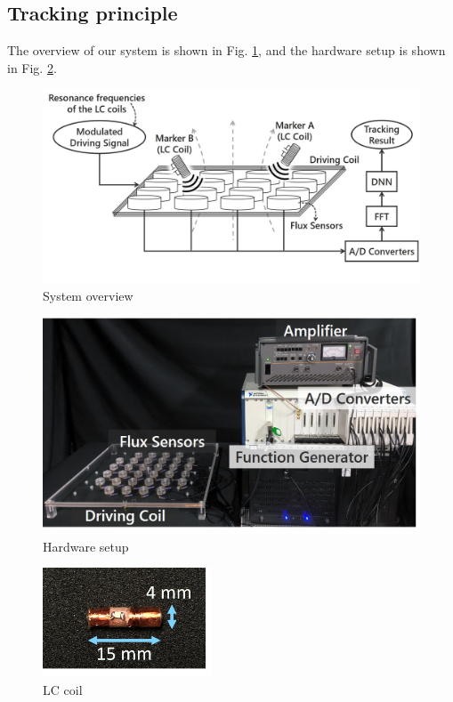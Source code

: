 \documentclass[journal,twoside,web]{ieeecolor}
\begin{document}
\subsection{Tracking principle}
The overview of our system is shown in Fig. \ref{overview_im3d}, and the hardware setup is shown in Fig. \ref{hardware_setup}.
\begin{figure}[!t]
    \centerline{\includegraphics[width=\columnwidth]{figure/overview_proposed.jpg}}
    \caption{System overview}
    \label{overview_im3d}
\end{figure}
\begin{figure}[!t]
    \centerline{\includegraphics[width=\columnwidth]{figure/hardware_setup.jpg}}
    \caption{Hardware setup}
    \label{hardware_setup}
\end{figure}
\begin{figure}[!t]
    \centerline{\includegraphics[width=50mm]{figure/LCcoil2.jpg}}
    \centering
    \caption{LC coil}
    \label{lc_coil}
\end{figure}
\end{document}
